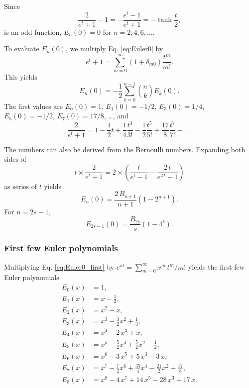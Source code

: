 \documentclass[aip,jcp,preprint,notitlepage, superscriptaddress]{revtex4-1}
\begin{document}
Since
\[
\frac{ 2 } {e^t + 1} - 1
=
-\frac{ e^t - 1 } {e^t + 1}
=
-\tanh \frac t 2,
\]
is an odd function,
$E_{n}(0) = 0$
for $n = 2, 4, 6, \dots$.



To evaluate $E_n(0)$,
we multiply Eq. \eqref{eq:Euler0}
by
\[
e^t + 1
=
\sum_{m = 0}^\infty
  (1 + \delta_{m0}) \frac{ t^m }{ m! }.
\]
This yields
\[
E_n(0)
=
-\frac{1}{2}
\sum_{k = 0}^{n - 1}
{n \choose k} E_k(0).
\]
The first values are
$E_0(0) = 1$,
$E_1(0) = -1/2$,
$E_3(0) = 1/4$,
$E_5(0) = -1/2$,
$E_7(0) = 17/8$,
\dots,
%
and
%
\begin{equation}
\frac 2 {e^t + 1}
=
1 - \frac 1 2 t
+ \frac 1 4 \frac{ t^3 }{ 3! }
- \frac 1 2 \frac{ t^5 }{ 5! }
+ \frac{ 17 }{ 8 } \frac{ t^7 }{ 7! }
- \dots.
\label{eq:Euler0_first}
\end{equation}


The numbers can also be derived from the Bernoulli numbers.
%
Expanding both sides of
\[
t \times \frac{ 2 }{ e^t + 1}
=
2 \times \left(
  \frac{ t }{ e^t - 1 }
  -
  \frac{ 2 \, t } { e^{2 \, t} - 1 }
\right)
\]
as series of $t$ yields
\[
E_n(0)
=
\frac{ 2 \, B_{n + 1} } { n + 1 }
\left( 1 - 2^{n + 1} \right).
\]
%
For $n = 2 s - 1$,
\[
E_{2 s - 1}(0)
=
\frac{ B_{2 s} } { s }
\left( 1 - 4^s \right).
\]



\subsubsection{First few Euler polynomials}




Multiplying Eq. \eqref{eq:Euler0_first}
by $e^{x t} = \sum_{m = 0}^\infty x^m \, t^m/m!$ yields
the first few Euler polynomials\cite{
abramowitz, wang_specfunc}
\begin{align*}
  E_0(x) &= 1, \\
  E_1(x) &= x -\frac 1 2, \\
  E_2(x) &= x^2 - x, \\
  E_3(x) &= x^3 - \frac 3 2 x^2 + \frac 1 4, \\
  E_4(x) &= x^4 - 2 \, x^3  + x, \\
  E_5(x) &= x^5 - \frac 5 2 x^4 + \frac 5 2 x^2 -\frac 1 2, \\
  E_6(x) &= x^6 - 3 \, x^5 + 5 \, x^3 - 3 \, x, \\
  E_7(x) &= x^7 - \frac 7 2 x^6 + \frac{35}{4} x^4 - \frac{21}{2} x^2 + \frac{ 17 } 8, \\
  E_8(x) &= x^8 - 4 \, x^7 + 14 \, x^5 - 28 \, x^3 + 17 \, x.
\end{align*}
\end{document}
